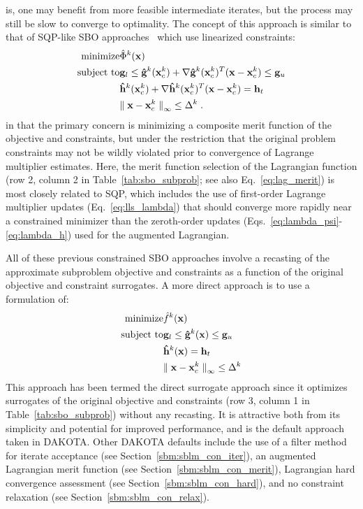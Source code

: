 is, one may benefit from more feasible intermediate iterates, but the
process may still be slow to converge to optimality.  The concept of
this approach is similar to that of SQP-like SBO
approaches~\cite{Ale00} which use linearized constraints:
\begin{eqnarray}
{\rm minimize } & {\hat \Phi}^k({\bf x}) \nonumber \\
{\rm subject\  to } 
& {\bf g}_l \le {\bf {\hat g}}^k({\bf x}^k_c) + 
\nabla {\bf {\hat g}}^k({\bf x}^k_c)^T ({\bf x} - {\bf x}^k_c) \le {\bf g}_u 
\nonumber \\
& {\bf {\hat h}}^k({\bf x}^k_c) + \nabla {\bf {\hat h}}^k({\bf x}^k_c)^T 
({\bf x} - {\bf x}^k_c) = {\bf h}_t \nonumber \\
& {\parallel {\bf x} - {\bf x}^k_c \parallel}_\infty \le \Delta^k \; . 
\label{eq:NLP_SBO_SQP}
\end{eqnarray}
in that the primary concern is minimizing a composite merit function
of the objective and constraints, but under the restriction that the
original problem constraints may not be wildly violated prior to
convergence of Lagrange multiplier estimates.  Here, the merit
function selection of the Lagrangian function (row 2, column 2 in
Table~\ref{tab:sbo_subprob}; see also Eq.~\ref{eq:lag_merit}) is most
closely related to SQP, which includes the use of first-order Lagrange
multiplier updates (Eq.~\ref{eq:lls_lambda}) that should converge more
rapidly near a constrained minimizer than the zeroth-order updates
(Eqs.~\ref{eq:lambda_psi}-\ref{eq:lambda_h}) used for the augmented
Lagrangian.

All of these previous constrained SBO approaches involve a recasting
of the approximate subproblem objective and constraints as a function
of the original objective and constraint surrogates.  A more direct
approach is to use a formulation of:
\begin{eqnarray}
{\rm minimize } & {\hat f}^k({\bf x}) \nonumber \\
{\rm subject\  to } 
	& {\bf g}_l \le {\bf {\hat g}}^k({\bf x}) \le {\bf g}_u \nonumber \\
	&               {\bf {\hat h}}^k({\bf x}) = {\bf h}_t \nonumber \\
	& {\parallel {\bf x} - {\bf x}^k_c \parallel}_\infty \le \Delta^k 
\label{eq:NLP_SBO_direct}
\end{eqnarray}
This approach has been termed the direct surrogate approach since it
optimizes surrogates of the original objective and constraints (row 3,
column 1 in Table~\ref{tab:sbo_subprob}) without any recasting.  It is
attractive both from its simplicity and potential for improved performance,
and is the default approach taken in DAKOTA.  Other DAKOTA defaults
include the use of a filter method for iterate acceptance (see
Section~\ref{sbm:sblm_con_iter}), an augmented Lagrangian merit
function (see Section~\ref{sbm:sblm_con_merit}), Lagrangian hard
convergence assessment (see Section~\ref{sbm:sblm_con_hard}), and no
constraint relaxation (see Section~\ref{sbm:sblm_con_relax}).

